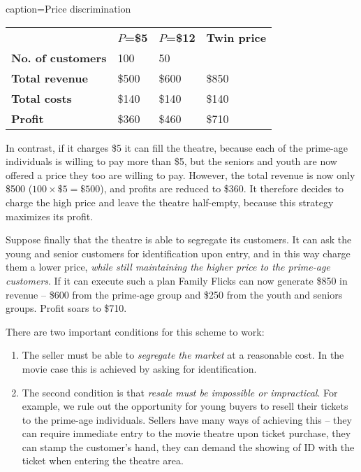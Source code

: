 \begin{Table}{caption={Price discrimination \label{table:pricediscrimination}}}
\begin{tabu} to 36em {|X[3,c]X[1,c]X[1,c]X[1,c]|} \hline 
		& \textbf{$P$=\$5}	& \textbf{$P$=\$12} & \textbf{Twin price} \\
	\textbf{No. of customers}		& 100	& 50	&	\\
		\textbf{Total revenue}	& \$500	& \$600 & \$850	\\ 
	\textbf{Total costs}	& \$140				& \$140 			& \$140	\\
		\textbf{Profit}		& \$360		& \$460 & \$710	\\ \hline 
\end{tabu}
\end{Table}

In contrast, if it charges \$5 it can fill the theatre, because each of the
prime-age individuals is willing to pay more than \$5, but the seniors and
youth are now offered a price they too are willing to pay. However, the
total revenue is now only \$500 ($100\times\$5=\$500$), and profits are
reduced to \$360. It therefore decides to charge the high price and leave
the theatre half-empty, because this strategy maximizes its profit.

Suppose finally that the theatre is able to segregate its customers. It can
ask the young and senior customers for identification upon entry, and in
this way charge them a lower price, \textit{while still maintaining the
	higher price to the prime-age customers}. If it can execute such a plan
Family Flicks can now generate \$850 in revenue -- \$600 from the prime-age
group and \$250 from the youth and seniors groups. Profit soars to \$710.

\newhtmlpage

There are two important conditions for this scheme to work:

\begin{enumerate}
	\item The seller must be able to \textit{segregate the market} at a
	reasonable cost. In the movie case this is achieved by asking for
	identification.
	
	\item The second condition is that \textit{resale must be impossible or
		impractical}. For example, we rule out the opportunity for young buyers to
	resell their tickets to the prime-age individuals. Sellers have many ways of
	achieving this -- they can require immediate entry to the movie theatre upon
	ticket purchase, they can stamp the customer's hand, they can demand the
	showing of ID with the ticket when entering the theatre area.
\end{enumerate}

